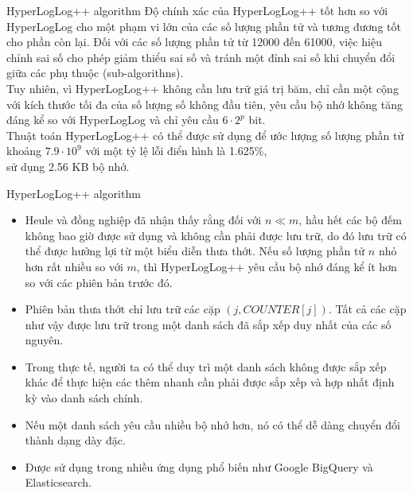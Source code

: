 \documentclass[10pt]{beamer}
\begin{document}
\begin{frame}{HyperLogLog++ algorithm}
  Độ chính xác của HyperLogLog++ tốt hơn so với HyperLogLog cho một phạm vi lớn của các số lượng phần tử và tương đương tốt cho phần còn lại. 
  Đối với các số lượng phần tử từ 12000 đến 61000, việc hiệu chỉnh sai số cho phép giảm thiểu sai số và tránh một đỉnh sai số khi chuyển đổi 
  giữa các phụ thuộc (sub-algorithns).\\
  
  Tuy nhiên, vì HyperLogLog++ không cần lưu trữ giá trị băm, chỉ cần một cộng với kích thước tối đa của số lượng số không đầu tiên, yêu cầu bộ nhớ 
  không tăng đáng kể so với HyperLogLog và chỉ yêu cầu $6 \cdot 2^p$ bit.\\
  
  Thuật toán HyperLogLog++ có thể được sử dụng để ước lượng số lượng phần tử \\
  khoảng $7.9 \cdot 10^9$ với một tỷ lệ lỗi điển hình là 1.625\%, \\
  sử dụng 2.56 KB bộ nhớ.
\end{frame}
\begin{frame}{HyperLogLog++ algorithm}
  \begin{itemize}
    \item Heule và đồng nghiệp đã nhận thấy rằng đối với $n \ll m$, hầu hết các bộ đếm 
    không bao giờ được sử dụng và không cần phải được lưu trữ, do đó lưu trữ có thể được hưởng lợi 
    từ một biểu diễn thưa thớt. Nếu số lượng phần tử $n$ nhỏ hơn rất nhiều 
    so với $m$, thì HyperLogLog++ yêu cầu bộ nhớ đáng kể ít hơn so với các phiên bản 
    trước đó.
    \item Phiên bản thưa thớt chỉ lưu trữ các cặp $(j, COUNTER[j])$. Tất cả các cặp 
    như vậy được lưu trữ trong một danh sách đã sắp xếp duy nhất của các số nguyên. 
    \item Trong thực tế, người ta có thể duy trì một 
    danh sách không được sắp xếp khác để thực hiện các thêm nhanh 
    cần phải được sắp xếp và hợp nhất định kỳ vào danh sách chính. 
    \item Nếu một danh sách yêu cầu nhiều bộ nhớ hơn, nó có thể dễ dàng chuyển đổi 
    thành dạng dày đặc. 
    \item Được sử dụng trong nhiều ứng dụng phổ biến như Google BigQuery và Elasticsearch.
  \end{itemize}
\end{frame}
\end{document}
